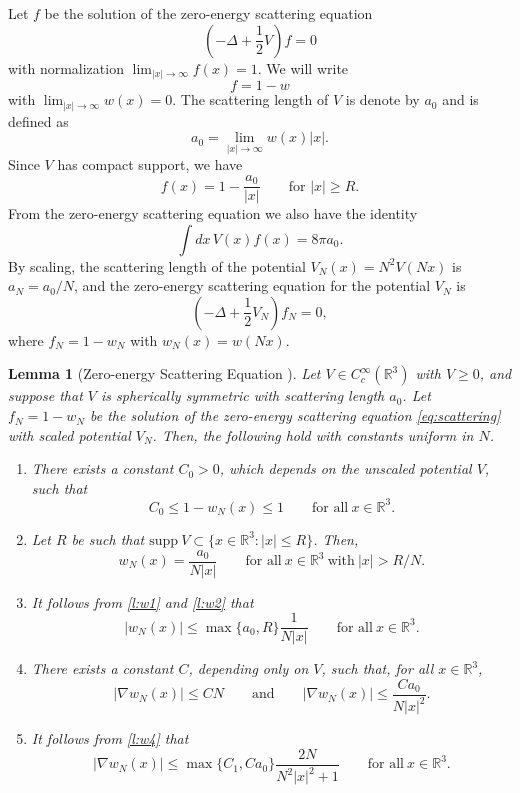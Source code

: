 \documentclass[11pt,a4paper,draft,DIV11]{scrartcl}	%
\newtheorem{lem}[thm]{Lemma}
\newcommand{\R}{\mathds{R}}
\begin{document}
Let $f$ be the solution of the zero-energy scattering equation
\[
  \left( -\Delta + \frac{1}{2} V \right) f = 0
\]
with normalization $\lim_{|x|\to\infty} f(x) = 1$. We will write
\[
  f = 1 - w
\]
with $\lim_{|x|\to\infty} w(x) = 0$. The scattering length of $V$ is denote
by $a_0$ and is defined as
\[
  a_0 = \lim_{|x| \to \infty} w(x)|x|.
\]
Since $V$ has compact support, we have
\[
  f(x) = 1 - \frac{a_0}{|x|} \qquad \text{for } |x| \ge R.
\]
From the zero-energy scattering equation we also have the identity
\[
  \int dx \, V(x) f(x) = 8 \pi a_0.
\]
By scaling, the scattering length of the potential $V_N(x) = N^2 V(Nx)$ is
$a_N = a_0/N$, and the zero-energy scattering equation for the potential $V_N$
is
\begin{equation} \label{eq:scattering}
  \left( -\Delta + \frac{1}{2} V_N \right) f_N = 0,
\end{equation}
where $f_N = 1 - w_N$ with $w_N(x) = w(Nx)$.


\begin{lem}[Zero-energy Scattering Equation \cite{ESY2010}] \label{l:w}
  Let $V \in C_c^\infty(\R^3)$ with $V \ge 0$, and suppose that $V$ is
  spherically symmetric with scattering length $a_0$. Let $f_N = 1 - w_N$ be
  the solution of the zero-energy scattering equation \eqref{eq:scattering}
  with scaled potential $V_N$. Then, the following hold with constants
  uniform in $N$.
  \begin{enumerate}
    \item \label{l:w1} There exists a constant $C_0 > 0$, which depends on
    the unscaled potential $V$, such that
      \[
        C_0 \le 1 - w_N(x) \le 1 \qquad \text{for all} \ x \in \R^3.
      \]
    \item \label{l:w2} Let $R$ be such that $\text{supp} \ V \subset \{ x
    \in \R^3 : |x| \le R \}$. Then,
      \[
        w_N(x) = \frac{a_0}{N|x|} \qquad \text{for all} \ x \in \R^3 \
        \text{with} \ |x| > R/N.
      \]
    \item \label{l:w3} It follows from \ref{l:w1} and \ref{l:w2} that
      \[
        |w_N(x)| \le \max\{a_0, R\} \frac{1}{N|x|} \qquad \text{for all} \ x
        \in \R^3.
      \]
    \item \label{l:w4} There exists a constant $C$, depending only on
      $V$, such that, for all $x \in \R^3$,
      \[
        \lvert\nabla w_N(x)\rvert \le C N \qquad \mbox{and} \qquad |\nabla w_N(x)| \le \frac{C a_0}{N |x|^2}.%
      \]
    \item \label{l:w5} It follows from \ref{l:w4} that
      \[
        |\nabla w_N(x)| \le \max\{ C_1, C a_0 \} \frac{2N}{N^2|x|^2 + 1}
        \qquad \text{for all} \ x \in \R^3.
      \]
  \end{enumerate}
\end{lem}
\end{document}
